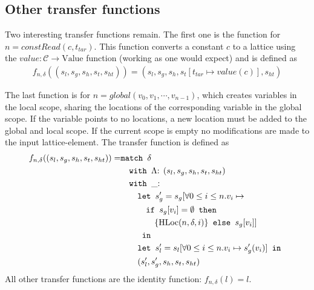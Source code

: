 \subsection{Other transfer functions}
\label{sec:otherTransferFuncs}
Two interesting transfer functions remain. The first one is the function for $n = \mathit{constRead}(c, t_{tar})$. This function converts a constant $c$ to a lattice using the $value : \mathcal{C} \rightarrow \text{Value}$ function (working as one would expect) and is defined as
\begin{align}
f_{n,\delta}((s_l, s_g, s_h, s_t,s_{ht})) = (s_l, s_g, s_h, s_t[t_{tar} \mapsto value(c)], s_{ht})
\end{align}

The last function is for $n = global(v_0, v_1, \cdots, v_{n-1})$, which creates variables in the local scope, sharing the locations of the corresponding variable in the global scope. If the variable points to no locations, a new location must be added to the global and local scope. If the current scope is empty no modifications are made to the input lattice-element. The transfer function is defined as
\begin{align}
f_{n, \delta} ((s_l,s_g,s_h,s_t, s_{ht})) =     &\texttt{match }\delta\notag\\
                                                &\quad\texttt{with }\Lambda\text{: }(s_l,s_g,s_h,s_t, s_{ht})\notag\\
                                                &\quad\texttt{with }\_\text{: }\notag\\
                                                &\quad\quad\texttt{let } s_g' = s_g[\forall 0\leq i \leq n. v_i\mapsto \notag\\                                                
                                                &\quad\quad\quad\texttt{if }s_g[v_i] = \emptyset\texttt{ then } \notag\\
                                                &\quad\quad\quad\quad\{\text{HLoc}(n, \delta, i)\} \texttt{ else } s_g[v_i]]\notag\\
                                                &\quad\quad \texttt{ in } \notag\\
                                                &\quad\quad\texttt{let } s_l'=s_l[\forall 0\leq i \leq n. v_i\mapsto s_g'(v_i)] \texttt{ in }\notag\\
                                                &\quad\quad(s_l',s_g',s_h,s_t, s_{ht})
\end{align}
All other transfer functions are the identity function: $f_{n,\delta}(l) = l$.

